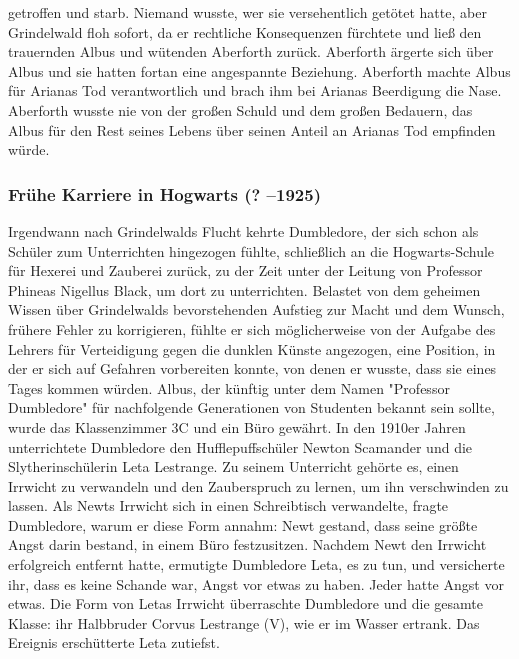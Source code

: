 \documentclass[a4paper, 10pt]{article}
\begin{document}
getroffen und starb. Niemand wusste, wer sie versehentlich getötet hatte, aber Grindelwald floh sofort, da er rechtliche Konsequenzen fürchtete und ließ den trauernden Albus und wütenden Aberforth zurück. Aberforth ärgerte sich über Albus und sie hatten fortan eine angespannte Beziehung. Aberforth machte Albus für Arianas Tod verantwortlich und brach ihm bei Arianas Beerdigung die Nase. Aberforth wusste nie von der großen Schuld und dem großen Bedauern, das Albus für den Rest seines Lebens über seinen Anteil an Arianas Tod empfinden würde.


\subsubsection*{\large Frühe Karriere in Hogwarts (? –1925)}
Irgendwann nach Grindelwalds Flucht kehrte Dumbledore, der sich schon als Schüler zum Unterrichten hingezogen fühlte, schließlich an die Hogwarts-Schule für Hexerei und Zauberei zurück, zu der Zeit unter der Leitung von Professor Phineas Nigellus Black, um dort zu unterrichten. Belastet von dem geheimen Wissen über Grindelwalds bevorstehenden Aufstieg zur Macht und dem Wunsch, frühere Fehler zu korrigieren, fühlte er sich möglicherweise von der Aufgabe des Lehrers für Verteidigung gegen die dunklen Künste angezogen, eine Position, in der er sich auf Gefahren vorbereiten konnte, von denen er wusste, dass sie eines Tages kommen würden. Albus, der künftig unter dem Namen "Professor Dumbledore" für nachfolgende Generationen von Studenten bekannt sein sollte, wurde das Klassenzimmer 3C und ein Büro gewährt.
\vspace{10pt}
\newline
In den 1910er Jahren unterrichtete Dumbledore den Hufflepuffschüler Newton Scamander und die Slytherinschülerin Leta Lestrange. Zu seinem Unterricht gehörte es, einen Irrwicht zu verwandeln und den Zauberspruch zu lernen, um ihn verschwinden zu lassen. Als Newts Irrwicht sich in einen Schreibtisch verwandelte, fragte Dumbledore, warum er diese Form annahm: Newt gestand, dass seine größte Angst darin bestand, in einem Büro festzusitzen. Nachdem Newt den Irrwicht erfolgreich entfernt hatte, ermutigte Dumbledore Leta, es zu tun, und versicherte ihr, dass es keine Schande war, Angst vor etwas zu haben. Jeder hatte Angst vor etwas. Die Form von Letas Irrwicht überraschte Dumbledore und die gesamte Klasse: ihr Halbbruder Corvus Lestrange (V), wie er im Wasser ertrank. Das Ereignis erschütterte Leta zutiefst.
\vspace{10pt}
\end{document}
